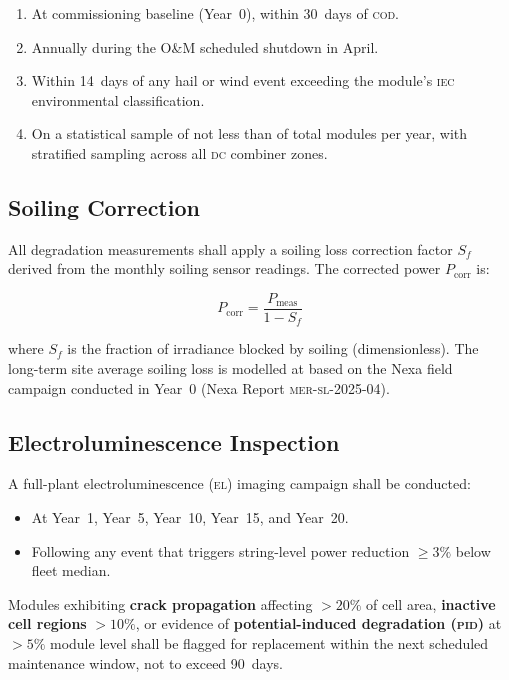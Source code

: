 \begin{enumerate}[leftmargin=1.6em, itemsep=3pt]
  \item At commissioning baseline (Year~0), within 30~days of \textsc{cod}.
  \item Annually during the O\&M scheduled shutdown in April.
  \item Within 14~days of any hail or wind event exceeding the module's \textsc{iec}
        environmental classification.
  \item On a statistical sample of not less than  of total modules per year,
        with stratified sampling across all \textsc{dc} combiner zones.
\end{enumerate}

\subsection{Soiling Correction}

All degradation measurements shall apply a soiling loss correction factor $S_f$ derived
from the monthly soiling sensor readings. The corrected power $P_{\text{corr}}$ is:

\[
  P_{\text{corr}} = \frac{P_{\text{meas}}}{1 - S_f}
\]

where $S_f$ is the fraction of irradiance blocked by soiling (dimensionless). The long-term
site average soiling loss is modelled at  based on the Nexa
field campaign conducted in Year~0 (Nexa Report \textsc{mer-sl-2025-04}).

\subsection{Electroluminescence Inspection}

A full-plant electroluminescence (\textsc{el}) imaging campaign shall be conducted:
\begin{itemize}[leftmargin=1.4em, itemsep=2pt]
  \item At Year~1, Year~5, Year~10, Year~15, and Year~20.
  \item Following any event that triggers string-level power reduction $\geq 3\%$ below
        fleet median.
\end{itemize}

Modules exhibiting \textbf{crack propagation} affecting $>20\%$ of cell area, \textbf{inactive
cell regions} $>10\%$, or evidence of \textbf{potential-induced degradation (\textsc{pid})} at
$> 5\%$ module level shall be flagged for replacement within the next scheduled maintenance
window, not to exceed 90~days.
